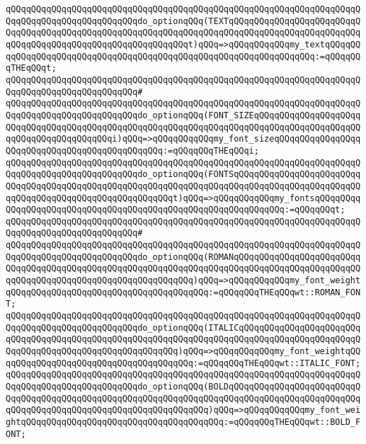 \verb|qQQqqQQqqQQqqQQqqQQqqQQqqQQqqQQqqQQqqQQqqQQqqQQqqQQqqQQqqQQqqQQqqQQqqQQqqQQqqQQqqQQqqQQqqQQqqQQqdo_optionqQQq(TEXTqQQqqQQqqQQqqQQqqQQqqQQqqQQqqQQqqQQqqQQqqQQqqQQqqQQqqQQqqQQqqQQqqQQqqQQqqQQqqQQqqQQqqQQqqQQqqQQqqQQqqQQqqQQqqQQqqQQqqQQqqQQqqQQqqQQqt)qQQq=>qQQqqQQqqQQqmy_textqQQqqQQqqQQqqQQqqQQqqQQqqQQqqQQqqQQqqQQqqQQqqQQqqQQqqQQqqQQqqQQqqQQq:=qQQqqQQqTHEqQQqt;|\newline
\verb|qQQqqQQqqQQqqQQqqQQqqQQqqQQqqQQqqQQqqQQqqQQqqQQqqQQqqQQqqQQqqQQqqQQqqQQqqQQqqQQqqQQqqQQqqQQqqQQq#|\newline
\verb|qQQqqQQqqQQqqQQqqQQqqQQqqQQqqQQqqQQqqQQqqQQqqQQqqQQqqQQqqQQqqQQqqQQqqQQqqQQqqQQqqQQqqQQqqQQqqQQqdo_optionqQQq(FONT_SIZEqQQqqQQqqQQqqQQqqQQqqQQqqQQqqQQqqQQqqQQqqQQqqQQqqQQqqQQqqQQqqQQqqQQqqQQqqQQqqQQqqQQqqQQqqQQqqQQqqQQqqQQqqQQqqQQqi)qQQq=>qQQqqQQqqQQqmy_font_sizeqQQqqQQqqQQqqQQqqQQqqQQqqQQqqQQqqQQqqQQqqQQqqQQq:=qQQqqQQqTHEqQQqi;|\newline
\verb|qQQqqQQqqQQqqQQqqQQqqQQqqQQqqQQqqQQqqQQqqQQqqQQqqQQqqQQqqQQqqQQqqQQqqQQqqQQqqQQqqQQqqQQqqQQqqQQqdo_optionqQQq(FONTSqQQqqQQqqQQqqQQqqQQqqQQqqQQqqQQqqQQqqQQqqQQqqQQqqQQqqQQqqQQqqQQqqQQqqQQqqQQqqQQqqQQqqQQqqQQqqQQqqQQqqQQqqQQqqQQqqQQqqQQqqQQqqQQqt)qQQq=>qQQqqQQqqQQqmy_fontsqQQqqQQqqQQqqQQqqQQqqQQqqQQqqQQqqQQqqQQqqQQqqQQqqQQqqQQqqQQqqQQq:=qQQqqQQqt;|\newline
\verb|qQQqqQQqqQQqqQQqqQQqqQQqqQQqqQQqqQQqqQQqqQQqqQQqqQQqqQQqqQQqqQQqqQQqqQQqqQQqqQQqqQQqqQQqqQQqqQQq#|\newline
\verb|qQQqqQQqqQQqqQQqqQQqqQQqqQQqqQQqqQQqqQQqqQQqqQQqqQQqqQQqqQQqqQQqqQQqqQQqqQQqqQQqqQQqqQQqqQQqqQQqdo_optionqQQq(ROMANqQQqqQQqqQQqqQQqqQQqqQQqqQQqqQQqqQQqqQQqqQQqqQQqqQQqqQQqqQQqqQQqqQQqqQQqqQQqqQQqqQQqqQQqqQQqqQQqqQQqqQQqqQQqqQQqqQQqqQQqqQQqqQQqqQQq)qQQq=>qQQqqQQqqQQqmy_font_weightqQQqqQQqqQQqqQQqqQQqqQQqqQQqqQQqqQQqqQQq:=qQQqqQQqTHEqQQqwt::ROMAN_FONT;|\newline
\verb|qQQqqQQqqQQqqQQqqQQqqQQqqQQqqQQqqQQqqQQqqQQqqQQqqQQqqQQqqQQqqQQqqQQqqQQqqQQqqQQqqQQqqQQqqQQqqQQqdo_optionqQQq(ITALICqQQqqQQqqQQqqQQqqQQqqQQqqQQqqQQqqQQqqQQqqQQqqQQqqQQqqQQqqQQqqQQqqQQqqQQqqQQqqQQqqQQqqQQqqQQqqQQqqQQqqQQqqQQqqQQqqQQqqQQqqQQqqQQq)qQQq=>qQQqqQQqqQQqmy_font_weightqQQqqQQqqQQqqQQqqQQqqQQqqQQqqQQqqQQqqQQq:=qQQqqQQqTHEqQQqwt::ITALIC_FONT;|\newline
\verb|qQQqqQQqqQQqqQQqqQQqqQQqqQQqqQQqqQQqqQQqqQQqqQQqqQQqqQQqqQQqqQQqqQQqqQQqqQQqqQQqqQQqqQQqqQQqqQQqdo_optionqQQq(BOLDqQQqqQQqqQQqqQQqqQQqqQQqqQQqqQQqqQQqqQQqqQQqqQQqqQQqqQQqqQQqqQQqqQQqqQQqqQQqqQQqqQQqqQQqqQQqqQQqqQQqqQQqqQQqqQQqqQQqqQQqqQQqqQQqqQQqqQQq)qQQq=>qQQqqQQqqQQqmy_font_weightqQQqqQQqqQQqqQQqqQQqqQQqqQQqqQQqqQQqqQQq:=qQQqqQQqTHEqQQqwt::BOLD_FONT;|\newline
